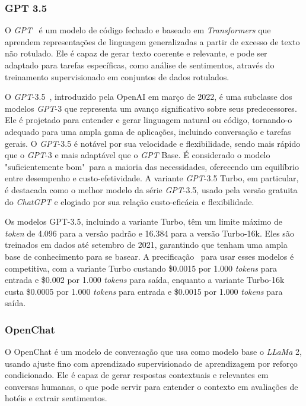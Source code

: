 \subsubsection{GPT 3.5}
\label{cap:fund_teorica:sec:modelos:subsec:gpt}

O \textit{GPT}~\cite{enwiki:1226113577} é um modelo de código fechado e baseado em \textit{Transformers} que aprendem representações de linguagem generalizadas a partir de excesso de texto não rotulado. Ele é capaz de gerar texto coerente e relevante, e pode ser adaptado para tarefas específicas, como análise de sentimentos, através do treinamento supervisionado em conjuntos de dados rotulados.

O \textit{GPT}-3.5~\cite{openai:gpt35turbo}, introduzido pela OpenAI em março de 2022, é uma subclasse dos modelos \textit{GPT}-3 que representa um avanço significativo sobre seus predecessores. Ele é projetado para entender e gerar linguagem natural ou código, tornando-o adequado para uma ampla gama de aplicações, incluindo conversação e tarefas gerais. O \textit{GPT}-3.5 é notável por sua velocidade e flexibilidade, sendo mais rápido que o \textit{GPT}-3 e mais adaptável que o \textit{GPT} Base. É considerado o modelo "suficientemente bom"\ para a maioria das necessidades, oferecendo um equilíbrio entre desempenho e custo-efetividade. A variante \textit{GPT}-3.5 Turbo, em particular, é destacada como o melhor modelo da série \textit{GPT}-3.5, usado pela versão gratuita do \textit{ChatGPT} e elogiado por sua relação custo-eficácia e flexibilidade.

Os modelos GPT-3.5, incluindo a variante Turbo, têm um limite máximo de \textit{token} de 4.096 para a versão padrão e 16.384 para a versão Turbo-16k. Eles são treinados em dados até setembro de 2021, garantindo que tenham uma ampla base de conhecimento para se basear. A precificação~\cite{openai:gptpricing} para usar esses modelos é competitiva, com a variante Turbo custando \$0.0015 por 1.000 \textit{tokens} para entrada e \$0.002 por 1.000 \textit{tokens} para saída, enquanto a variante Turbo-16k custa \$0.0005 por 1.000 \textit{tokens} para entrada e \$0.0015 por 1.000 \textit{tokens} para saída.

\subsubsection{OpenChat}
\label{cap:fund_teorica:sec:modelos:subsec:openchat}

O OpenChat \cite{wang2024openchat} é um modelo de conversação que usa como modelo base o \textit{LLaMa} 2, usando ajuste fino com aprendizado supervisionado de aprendizagem por reforço condicionado. Ele é capaz de gerar respostas contextuais e relevantes em conversas humanas, o que pode servir para entender o contexto em avaliações de hotéis e extrair sentimentos.

